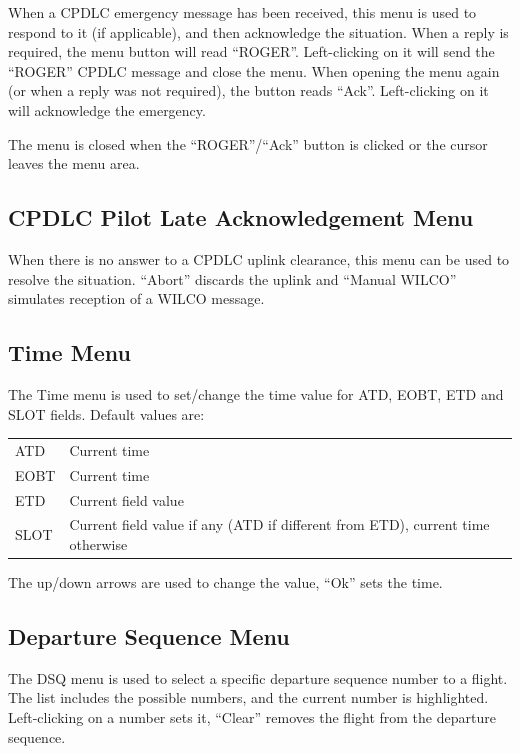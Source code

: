 \documentclass[a4paper,oneside,11pt]{memoir}
\begin{document}
When a CPDLC emergency message has been received, this menu is used to respond to it (if applicable), and then acknowledge the situation. When a reply is required, the menu button will read “ROGER”. Left-clicking on it will send the “ROGER” CPDLC message and close the menu. When opening the menu again (or when a reply was not required), the button reads “Ack”. Left-clicking on it will acknowledge the emergency. 

\bigskip

The menu is closed when the “ROGER”/“Ack” button is clicked or the cursor leaves the menu area.

\subsection{CPDLC Pilot Late Acknowledgement Menu}
\label{menu:dlplam}

When there is no answer to a CPDLC uplink clearance, this menu can be used to resolve the situation. “Abort” discards the uplink and “Manual WILCO” simulates reception of a WILCO message.

\subsection{Time Menu}
\label{menu:tm}

The Time menu is used to set/change the time value for ATD, EOBT, ETD and SLOT fields.
Default values are:

\begin{longtable}{p{5cm} p{7.5cm}}
ATD     & Current time\\
EOBT    & Current time\\
ETD     & Current field value\\
SLOT    & Current field value if any (ATD if different from ETD), current time otherwise\\
\end{longtable}

The up/down arrows are used to change the value, “Ok” sets the time.

\subsection{Departure Sequence Menu}
\label{menu:dqm}

The DSQ menu is used to select a specific departure sequence number to a flight. The list includes the possible numbers, and the current number is highlighted. Left-clicking on a number sets it, “Clear” removes the flight from the departure sequence.
\end{document}
